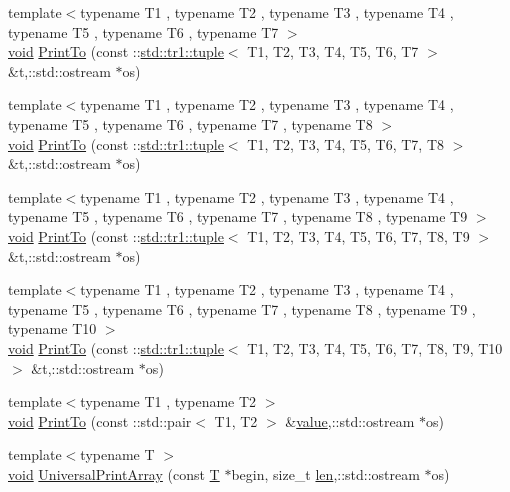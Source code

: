 \begin{DoxyCompactItemize}
\item 
{\footnotesize template$<$typename T1 , typename T2 , typename T3 , typename T4 , typename T5 , typename T6 , typename T7 $>$ }\\\hyperlink{legacy_8hpp_a8bb47f092d473522721002c86c13b94e}{void} \hyperlink{namespacetesting_1_1internal_aa3a910677d224678f1074520bc4f625f}{Print\-To} (const \-::\hyperlink{classstd_1_1tr1_1_1tuple}{std\-::tr1\-::tuple}$<$ T1, T2, T3, T4, T5, T6, T7 $>$ \&t,\-::std\-::ostream $\ast$os)
\item 
{\footnotesize template$<$typename T1 , typename T2 , typename T3 , typename T4 , typename T5 , typename T6 , typename T7 , typename T8 $>$ }\\\hyperlink{legacy_8hpp_a8bb47f092d473522721002c86c13b94e}{void} \hyperlink{namespacetesting_1_1internal_a0f47a6e3634be969039e1e6eb902934f}{Print\-To} (const \-::\hyperlink{classstd_1_1tr1_1_1tuple}{std\-::tr1\-::tuple}$<$ T1, T2, T3, T4, T5, T6, T7, T8 $>$ \&t,\-::std\-::ostream $\ast$os)
\item 
{\footnotesize template$<$typename T1 , typename T2 , typename T3 , typename T4 , typename T5 , typename T6 , typename T7 , typename T8 , typename T9 $>$ }\\\hyperlink{legacy_8hpp_a8bb47f092d473522721002c86c13b94e}{void} \hyperlink{namespacetesting_1_1internal_ad15d6fe963a626de83caee897c8221bc}{Print\-To} (const \-::\hyperlink{classstd_1_1tr1_1_1tuple}{std\-::tr1\-::tuple}$<$ T1, T2, T3, T4, T5, T6, T7, T8, T9 $>$ \&t,\-::std\-::ostream $\ast$os)
\item 
{\footnotesize template$<$typename T1 , typename T2 , typename T3 , typename T4 , typename T5 , typename T6 , typename T7 , typename T8 , typename T9 , typename T10 $>$ }\\\hyperlink{legacy_8hpp_a8bb47f092d473522721002c86c13b94e}{void} \hyperlink{namespacetesting_1_1internal_ab4c216410a9d9080b63f19a31a18c76a}{Print\-To} (const \-::\hyperlink{classstd_1_1tr1_1_1tuple}{std\-::tr1\-::tuple}$<$ T1, T2, T3, T4, T5, T6, T7, T8, T9, T10 $>$ \&t,\-::std\-::ostream $\ast$os)
\item 
{\footnotesize template$<$typename T1 , typename T2 $>$ }\\\hyperlink{legacy_8hpp_a8bb47f092d473522721002c86c13b94e}{void} \hyperlink{namespacetesting_1_1internal_a5759c5abed8ebab0e1a8a0f8aadab768}{Print\-To} (const \-::std\-::pair$<$ T1, T2 $>$ \&\hyperlink{highgui__c_8h_ad4670c92695d4327c21292905a803901}{value},\-::std\-::ostream $\ast$os)
\item 
{\footnotesize template$<$typename T $>$ }\\\hyperlink{legacy_8hpp_a8bb47f092d473522721002c86c13b94e}{void} \hyperlink{namespacetesting_1_1internal_a73b5046a2ed65d0e2fb7cdc9bdaee3fe}{Universal\-Print\-Array} (const \hyperlink{calib3d_8hpp_a3efb9551a871ddd0463079a808916717}{T} $\ast$begin, size\-\_\-t \hyperlink{core__c_8h_accb79be93f4fbcaa15b5a7670569c9f8}{len},\-::std\-::ostream $\ast$os)

\end{DoxyCompactItemize}
